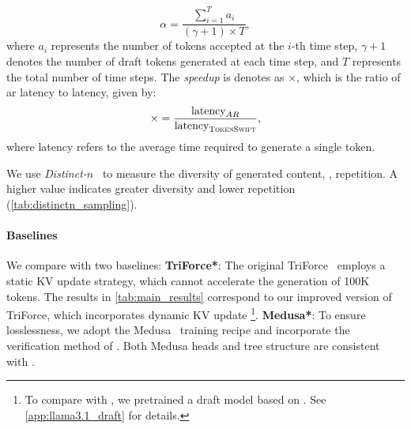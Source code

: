 \begin{equation}
    \label{equ:alpha}
    \alpha = \frac{\sum_{i=1}^T a_i}{(\gamma+1) \times T},
\end{equation}
where $a_i$ represents the number of tokens accepted at the $i$-th time step, $\gamma+1$ denotes the number of draft tokens generated at each time step, and $T$ represents the total  number of time steps. The \emph{speedup} is denotes as $\times$, which is the ratio of \ac{ar} latency to \ours latency, given by:
\begin{equation}
    \label{equ:times}
    \times = \frac{\text{latency}_{AR}}{\text{latency}_{\textsc{TokenSwift}}},
\end{equation}
where latency refers to the average time required to generate a single token.

We use \emph{Distinct-$n$}~\citep{distinctn} to measure the diversity of generated content, \ie, repetition. A higher value indicates greater diversity and lower repetition (\cref{tab:distinctn_sampling}). 
\vspace{-0.05 in}
\paragraph{Baselines}
\label{para:baseline}
We compare \ours with two baselines:
\textbf{TriForce*}: The original TriForce~\citep{triforce} employs a static KV update strategy, which cannot accelerate the generation of 100K tokens. The results in \cref{tab:main_results} correspond to our improved version of TriForce, which incorporates dynamic KV update \footnote{To compare with \llama, we pretrained a draft model based on \llama. See \cref{app:llama3.1_draft} for details.}.
\textbf{Medusa*}: %
To ensure losslessness, we adopt the Medusa~\citep{medusa} training recipe and incorporate the verification method of \ours. Both Medusa heads and tree structure are consistent with \ours.

